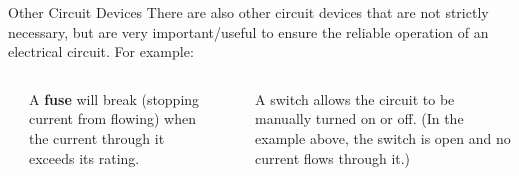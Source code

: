 \documentclass[12pt,aspectratio=169]{beamer}
\begin{document}
\begin{frame}{Other Circuit Devices}
  There are also other circuit devices that are not strictly necessary, but
  are very important/useful to ensure the reliable operation of an electrical
  circuit. For example:
  \begin{columns}[T]
    \begin{center}
      \vspace{.15in}
    \end{center}
    A \textbf{fuse} will break (stopping current from flowing) when the
    current through it exceeds its rating.

    \begin{center}
    \end{center}
    A switch allows the circuit to be manually turned on or off.
    (In the example above, the switch is open and no current flows through it.)
  \end{columns}
\end{frame}
\end{document}
